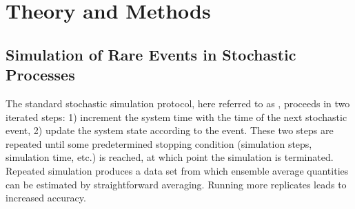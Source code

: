 %
%
%
%

\section{Theory and Methods}
\label{sec:methods}

\subsection{Simulation of Rare Events in Stochastic Processes}
\label{sec:ds_es_description}

The standard stochastic simulation protocol, here referred to as , proceeds in two iterated steps: 1) increment the system time with the time of the next stochastic event, 2) update the system state according to the event. These two steps are repeated until some predetermined stopping condition (simulation steps, simulation time, etc.) is reached, at which point the simulation is terminated. Repeated  simulation produces a data set from which ensemble average quantities can be estimated by straightforward averaging. Running more  replicates leads to increased accuracy.
	
